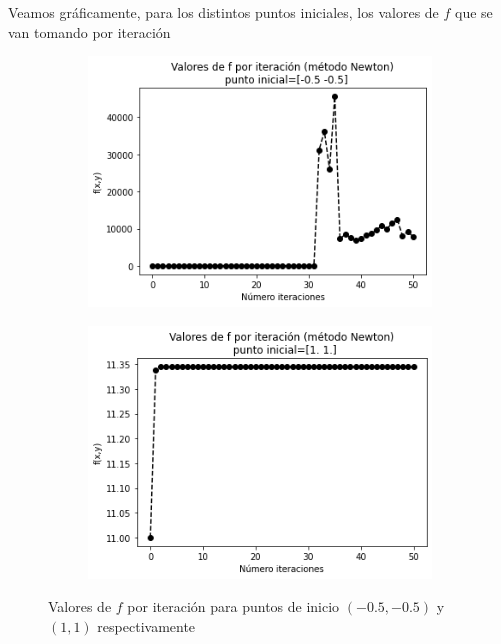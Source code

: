 \documentclass[11pt,a4paper]{article}
\theoremstyle{definition}
\begin{document}
	Veamos gráficamente, para los distintos puntos iniciales, los valores de $f$ que se van tomando por iteración
	\begin{figure}[H]
		\centering
		\begin{subfigure}{.5\textwidth}
  		\centering
  		\includegraphics[width=1\textwidth]{images/newton1}
  		\label{fig:sub1}
		\end{subfigure}%
		\begin{subfigure}{.5\textwidth}
  		\centering
  		\includegraphics[width=1\textwidth]{images/newton2}
  		\label{fig:sub2}
		\end{subfigure}
		\caption{Valores de $f$ por iteración para puntos de inicio $(-0.5, -0.5)$ y $(1,1)$ respectivamente}
		\label{fig:test}
	\end{figure}
	
\end{document}

